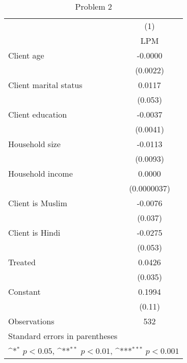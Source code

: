 \begin{table}[htbp]\centering
\def\sym#1{\ifmmode^{#1}\else\(^{#1}\)\fi}
\caption{Problem 2\label{q2}}
\begin{tabular}{l*{1}{c}}
\toprule
                    &\multicolumn{1}{c}{(1)}\\
                    &\multicolumn{1}{c}{LPM}\\
\midrule
Client age          &     -0.0000         \\
                    &    (0.0022)         \\
\addlinespace
Client marital status&      0.0117         \\
                    &     (0.053)         \\
\addlinespace
Client education    &     -0.0037         \\
                    &    (0.0041)         \\
\addlinespace
Household size      &     -0.0113         \\
                    &    (0.0093)         \\
\addlinespace
Household income    &      0.0000         \\
                    & (0.0000037)         \\
\addlinespace
Client is Muslim    &     -0.0076         \\
                    &     (0.037)         \\
\addlinespace
Client is Hindi     &     -0.0275         \\
                    &     (0.053)         \\
\addlinespace
Treated             &      0.0426         \\
                    &     (0.035)         \\
\addlinespace
Constant            &      0.1994         \\
                    &      (0.11)         \\
\midrule
Observations        &         532         \\
\bottomrule
\multicolumn{2}{l}{\footnotesize Standard errors in parentheses}\\
\multicolumn{2}{l}{\footnotesize \sym{*} \(p<0.05\), \sym{**} \(p<0.01\), \sym{***} \(p<0.001\)}\\
\end{tabular}
\end{table}
